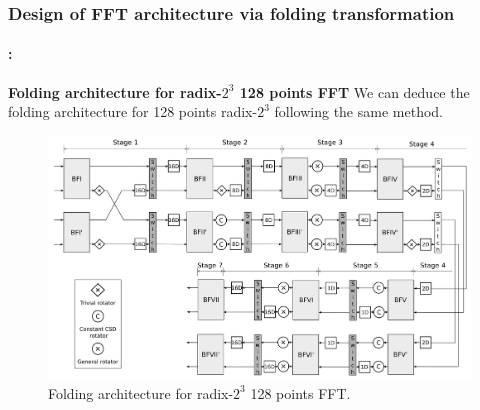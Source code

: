 \begin{frame}
	\frametitle{\textbf{Design of FFT architecture via folding transformation}}
	\framesubtitle{\secname : \subsecname}
	\begin{block}{\centering \textbf{Folding architecture for radix-$2^3$ 128 points FFT}} \justifying\footnotesize
	We can deduce the folding architecture for 128 points radix-$2^3$ following the same method. 
	\end{block}	
	\vspace{-0.15cm}
		\begin{figure}[h!] \centering
		   	\includegraphics[width=0.70\paperwidth]{./image/folding-128.png}
		   	\vspace{-0.15cm}
		   	\caption{ \tiny Folding architecture for radix-$2^3$ 128 points FFT.}
		\end{figure}  	
\end{frame}